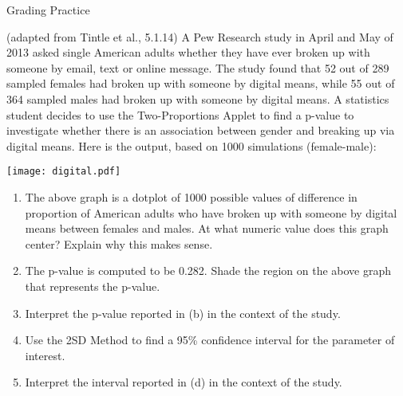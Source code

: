 \documentclass[12pt]{article}
\begin{document}
\thispagestyle{empty}

\begin{center}

Grading Practice

\end{center}

(adapted from Tintle et al., 5.1.14) A Pew Research study in April and May of 2013 asked single American adults whether they have ever broken up with someone by email, text or online message. The study found that 52 out of 289 sampled females had broken up with someone by digital means, while 55 out of 364 sampled males had broken up with someone by digital means. A statistics student decides to use the Two-Proportions Applet to find a p-value to investigate whether there is an association between gender and breaking up via digital means. Here is the output, based on 1000 simulations (female-male):
\begin{center}
	\texttt{[image: digital.pdf]}
\end{center}
\begin{enumerate}
\item The above graph is a dotplot of 1000 possible values of difference in proportion of American adults who have broken up with someone by digital means between females and males. At what numeric value does this graph center? Explain why this makes sense.


\newpage

\item The p-value is computed to be 0.282. Shade the region on the above graph that represents the p-value.

\item Interpret the p-value reported in (b) in the context of the study.

\vspace{40mm}

\item Use the 2SD Method to find a 95\% confidence interval for the parameter of interest.

\vspace{40mm}

\item Interpret the interval reported in (d) in the context of the study.


\end{enumerate}
\end{document}

